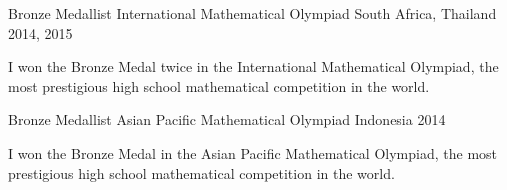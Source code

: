 


\begin{cventries}
	
	
	\cventry
	{Bronze Medallist} %
	{International Mathematical Olympiad} %
	{South Africa, Thailand} %
	{2014, 2015} %
	{ %
		\begin{cvitems}
			\item {I won the Bronze Medal twice in the International Mathematical Olympiad, the most prestigious high school mathematical competition in the world.}
		\end{cvitems}
	}
	
	
	\cventry
	{Bronze Medallist} %
	{Asian Pacific Mathematical Olympiad} %
	{Indonesia} %
	{2014} %
	{ %
		\begin{cvitems}
			\item {I won the Bronze Medal in the Asian Pacific Mathematical Olympiad, the most prestigious high school mathematical competition in the world.}
		\end{cvitems}
	}
	
	
\end{cventries}
